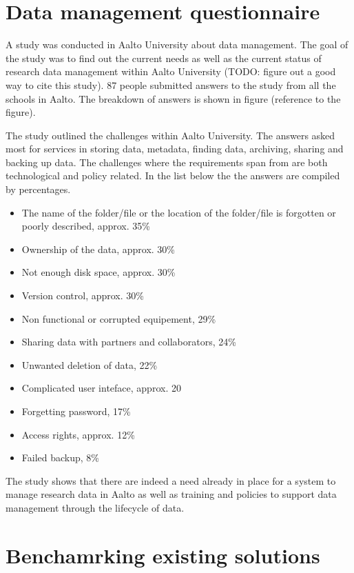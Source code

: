 \section{Data management questionnaire}
\label{sec:questionnaire}

A study was conducted in Aalto University about data management. The goal of
the study was to find out the current needs as well as the current status of
research data management within Aalto University (TODO: figure out a good way
to cite this study). 87 people submitted answers to the study from all the
schools in Aalto. The breakdown of answers is shown in figure (reference to the
figure).

The study outlined the challenges within Aalto University. The answers asked
most for services in storing data, metadata, finding data, archiving, sharing
and backing up data. The challenges where the requirements span from are both
technological and policy related. In the list below the the answers are
compiled by percentages.

\begin{itemize}
    \item The name of the folder/file or the location of the folder/file is
          forgotten or poorly described, approx. 35\%
    \item Ownership of the data, approx. 30\%
    \item Not enough disk space, approx. 30\%
    \item Version control, approx. 30\%
    \item Non functional or corrupted equipement, 29\%
    \item Sharing data with partners and collaborators, 24\%
    \item Unwanted deletion of data, 22\%
    \item Complicated user inteface, approx. 20%
    \item Forgetting password, 17\%
    \item Access rights, approx. 12\%
    \item Failed backup, 8\%
\end{itemize}

The study shows that there are indeed a need already in place for a system to
manage research data in Aalto as well as training and policies to support data
management through the lifecycle of data.

\section{Benchamrking existing solutions}
\label{sec:benchamrking}

